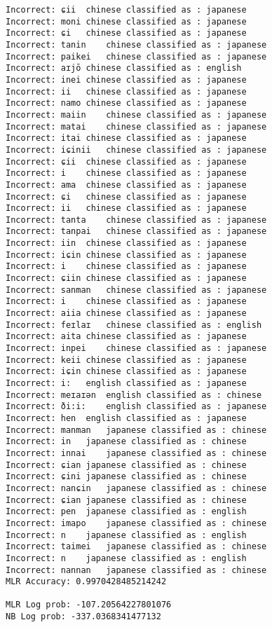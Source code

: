 \documentclass[a4paper]{article}
\begin{document}
\begin{verbatim}
Incorrect: ɕii	chinese classified as : japanese
Incorrect: moni	chinese classified as : japanese
Incorrect: ɕi	chinese classified as : japanese
Incorrect: tanin	chinese classified as : japanese
Incorrect: paikei	chinese classified as : japanese
Incorrect: aɪjō	chinese classified as : english
Incorrect: inei	chinese classified as : japanese
Incorrect: ii	chinese classified as : japanese
Incorrect: namo	chinese classified as : japanese
Incorrect: maiin	chinese classified as : japanese
Incorrect: matai	chinese classified as : japanese
Incorrect: itai	chinese classified as : japanese
Incorrect: iɕinii	chinese classified as : japanese
Incorrect: ɕii	chinese classified as : japanese
Incorrect: i	chinese classified as : japanese
Incorrect: ama	chinese classified as : japanese
Incorrect: ɕi	chinese classified as : japanese
Incorrect: ii	chinese classified as : japanese
Incorrect: tanta	chinese classified as : japanese
Incorrect: tanpai	chinese classified as : japanese
Incorrect: iin	chinese classified as : japanese
Incorrect: iɕin	chinese classified as : japanese
Incorrect: i	chinese classified as : japanese
Incorrect: ɕiin	chinese classified as : japanese
Incorrect: sanman	chinese classified as : japanese
Incorrect: i	chinese classified as : japanese
Incorrect: aiia	chinese classified as : japanese
Incorrect: feɪlaɪ	chinese classified as : english
Incorrect: aita	chinese classified as : japanese
Incorrect: inpei	chinese classified as : japanese
Incorrect: keii	chinese classified as : japanese
Incorrect: iɕin	chinese classified as : japanese
Incorrect: i:	english classified as : japanese
Incorrect: meɪaɪən	english classified as : chinese
Incorrect: ði:i:	english classified as : japanese
Incorrect: hen	english classified as : japanese
Incorrect: manman	japanese classified as : chinese
Incorrect: in	japanese classified as : chinese
Incorrect: innai	japanese classified as : chinese
Incorrect: ɕian	japanese classified as : chinese
Incorrect: ɕini	japanese classified as : chinese
Incorrect: nanɕin	japanese classified as : chinese
Incorrect: ɕian	japanese classified as : chinese
Incorrect: pen	japanese classified as : english
Incorrect: imapo	japanese classified as : chinese
Incorrect: n	japanese classified as : english
Incorrect: taimei	japanese classified as : chinese
Incorrect: n	japanese classified as : english
Incorrect: nannan	japanese classified as : chinese
MLR Accuracy: 0.9970428485214242

MLR Log prob: -107.20564227801076
NB Log prob: -337.0368341477132
\end{verbatim}
\end{document}
